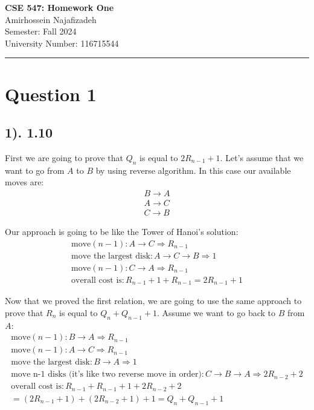 \documentclass[12pt]{article}
\begin{document}
\begin{center}
    {\LARGE\textbf{CSE 547: Homework One}} \\[1em]
    {\large Amirhossein Najafizadeh} \\[1em]
    Semester: Fall 2024 \\ 
    University Number: 116715544 \\[1em]
    \noindent\rule{\textwidth}{0.6pt}
\end{center}

\section*{Question 1}
\subsection*{1). 1.10}
First we are going to prove that $Q_{n}$ is equal to $2R_{n-1}+1$. Let's assume that we want to go from $A$ to $B$ by using reverse algorithm. In this case our available moves are:
\begin{gather*}
B \to A \\
A \to C \\
C \to B
\end{gather*}

Our approach is going to be like the Tower of Hanoi's solution:
\begin{gather*}
\text{move} (n-1) : A \to C \Rightarrow R_{n-1} \\
\text{move the largest disk} : A \to C \to B \Rightarrow 1 \\
\text{move} (n-1) : C \to A \Rightarrow R_{n-1} \\
\text{overall cost is} : R_{n-1} + 1 + R_{n-1} = 2R_{n-1} + 1
\end{gather*}

Now that we proved the first relation, we are going to use the same approach to prove that $R_{n}$ is equal to $Q_{n}+Q_{n-1}+1$. Assume we want to go back to $B$ from $A$:
\begin{gather*}
\text{move} (n-1) : B \to A \Rightarrow R_{n-1} \\
\text{move} (n-1) : A \to C \Rightarrow R_{n-1} \\
\text{move the largest disk} : B \to A \Rightarrow 1 \\
\text{move n-1 disks (it's like two reverse move in order)} : C \to B \to A \Rightarrow 2R_{n-2}+2 \\
\text{overall cost is} : R_{n-1} + R_{n-1} + 1 + 2R_{n-2} + 2 \\= (2R_{n-1} + 1) + (2R_{n-2} + 1) + 1 = Q_{n} + Q_{n-1} + 1
\end{gather*}
\end{document}
